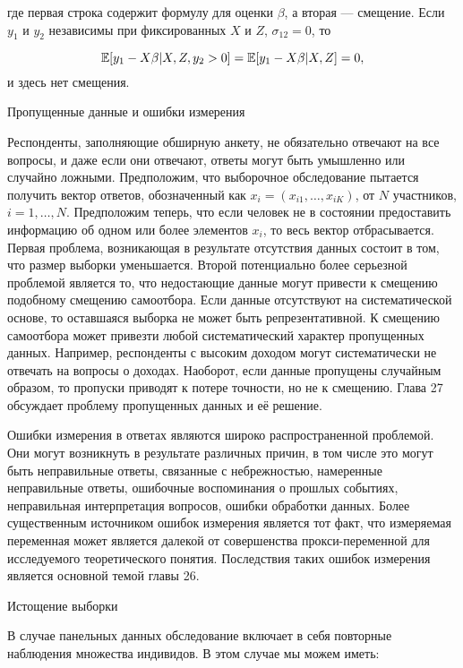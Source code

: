 где первая строка содержит формулу для оценки $\beta$, а вторая ---  смещение. Если $y_{1}$ и $y_{2}$ независимы при фиксированных $X$ и $Z$, $\sigma_{12}=0$, то

\[
\mathbb{E}[y_{1}-X\beta|X,Z,y_{2}>0]=\mathbb{E}[y_{1}-X\beta|X,Z]=0,
\]
и здесь нет смещения.

\begin{center}
Пропущенные данные и ошибки измерения
\end{center}

Респонденты, заполняющие обширную анкету, не обязательно отвечают на все вопросы, и даже если они отвечают, ответы могут быть умышленно или случайно ложными. Предположим, что выборочное обследование пытается получить вектор ответов, обозначенный как $x_{i}=(x_{i1},\dots,x_{iK})$, от $N$ участников, $i= 1,\dots, N$. Предположим теперь, что если человек не в состоянии предоставить информацию об одном или более элементов $x_{i}$, то весь вектор отбрасывается. Первая проблема, возникающая в результате отсутствия данных состоит в том, что размер выборки уменьшается. Второй потенциально более серьезной проблемой является то, что недостающие данные могут привести к смещению подобному смещению самоотбора. Если данные отсутствуют  на систематической основе, то оставшаяся выборка не может быть репрезентативной. К смещению самоотбора может привезти любой систематический характер пропущенных данных. Например, респонденты с высоким доходом могут систематически не отвечать на вопросы о доходах. Наоборот, если данные пропущены случайным образом, то пропуски приводят к потере точности, но не к смещению. Глава 27 обсуждает проблему пропущенных данных и её решение.


Ошибки измерения в ответах являются широко распространенной проблемой. Они могут возникнуть в результате различных причин, в том числе это могут быть неправильные ответы, связанные с небрежностью, намеренные неправильные ответы, ошибочные воспоминания о прошлых событиях, неправильная интерпретация вопросов, ошибки обработки данных.  Более существенным источником ошибок измерения является тот факт, что измеряемая переменная может является далекой от совершенства прокси-переменной для исследуемого теоретического понятия. Последствия таких ошибок измерения является основной темой главы 26.


\begin{center}
Истощение выборки
\end{center}

В случае панельных данных обследование включает в себя повторные наблюдения множества индивидов. В этом случае мы можем иметь:

